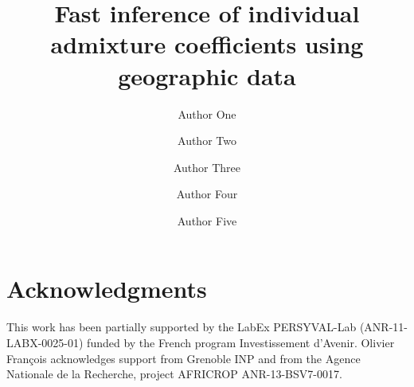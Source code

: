 \documentclass[12pt,lineno]{gsajnl}
\title{Fast inference of individual admixture coefficients using geographic data}
\author[$\ast$,1]{Author One}
\author[$\dagger$]{Author Two}
\author[$\ddagger$]{Author Three}
\author[$\S$]{Author Four}
\author[$\ast\ast$]{Author Five}
\affil[$\ast$]{Author one affiliation}
\affil[$\dagger$]{Author two affiliation}
\affil[$\ddagger$]{Author three affiliation}
\affil[$\S$]{Author four affiliation}
\affil[$\ast\ast$]{Author five affiliation}
\begin{document}
\baselineskip 0.8cm

\maketitle
\thispagestyle{firststyle}
\marginmark
\firstpagefootnote
{}
\vspace{-11pt}%






\section*{Acknowledgments} 

This work has been partially supported by the LabEx PERSYVAL-Lab (ANR-11-LABX-0025-01) funded by the French program Investissement d\rq{}Avenir. Olivier Fran\c cois acknowledges support from Grenoble INP and from the Agence Nationale de la Recherche, project AFRICROP ANR-13-BSV7-0017.

\newpage 



\end{document}
